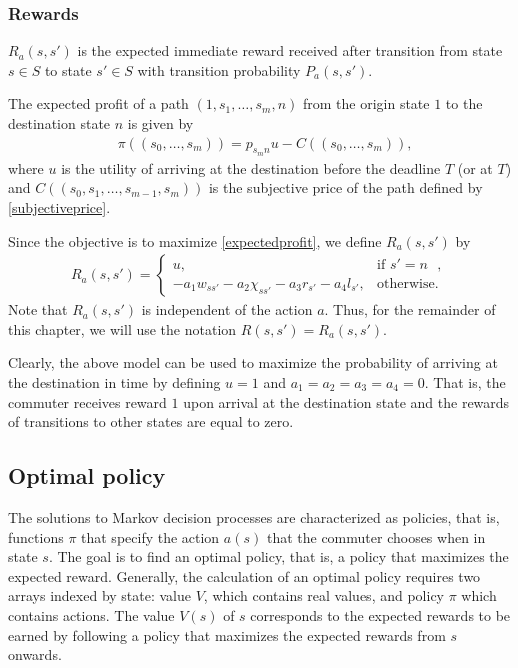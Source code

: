 \documentclass[dissertation,draft*]{aaltoseries}
\begin{document}
\subsubsection{Rewards}
\label{rewardsdef}
$R_a(s,s')$ is the expected immediate reward received after transition from state $s \in S$ to state $s' \in S$ 
with transition probability $P_a(s,s')$. 

The expected profit of a path $(1,s_1,\ldots,s_{m},n)$ from the origin state $1$ to the destination state $n$
is given by 
\begin{align}
\label{expectedprofit}
 &\pi \left((s_0,\ldots, s_m) \right) 
= p_{s_{m}n} u - C \left((s_0,\ldots, s_m) \right),  
\end{align}
where $u$ is the utility of arriving at the destination before the deadline $T$ (or at $T$) 
and $C \left((s_0,s_1,\ldots,s_{m-1}, s_m) \right)$
is the subjective price of the path defined by \eqref{subjectiveprice}.

Since the objective is to maximize \eqref{expectedprofit}, we define $R_a(s,s')$ by
\begin{align}
\label{rewards}
 R_a(s,s')= 
\left\{
\begin{array}{ll}
u, &  \mbox{if $s' = n$ },\\ 
- a_1w_{ss'} - a_2 \chi_{ss'} - a_3 r_{s'} - a_4 l_{s'}, & \mbox{otherwise.}
\end{array}
\right.
\end{align}
Note that $R_a(s,s')$ is independent of the action $a$. Thus, for the remainder of this chapter, we will use
the notation $R(s,s') = R_a(s,s')$.

Clearly, the above model can be used to maximize the probability of arriving at the destination in
time by defining $u=1$ and $a_1=a_2=a_3=a_4=0$. That is, the commuter receives reward $1$ upon arrival at the 
destination state and the rewards of transitions to other states are equal to zero.

\subsection{Optimal policy}
\label{solution}
The solutions to Markov decision processes are characterized as policies, 
that is, functions $\pi$ that specify the action 
$a(s) $ that the commuter chooses when in state $s$. 
The goal is to find an optimal policy, that is, a policy that maximizes the expected reward. 
Generally, the calculation of an optimal policy requires two arrays indexed by state: 
value $V$, which contains real values, and policy $\pi$ which contains actions. 
The value $V(s)$ of $s$ corresponds to the expected rewards to be earned by following a 
policy that maximizes the expected rewards from $s$ onwards.
\end{document}
